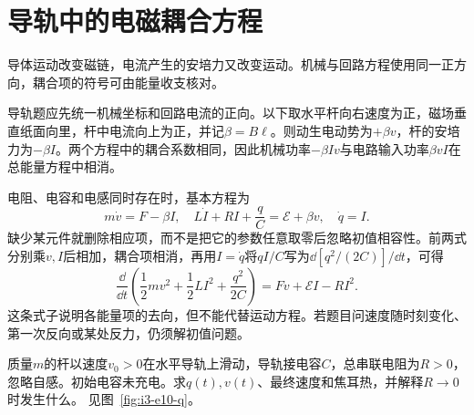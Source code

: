\section{导轨中的电磁耦合方程}\label{sec:i3-coupling}
导体运动改变磁链，电流产生的安培力又改变运动。机械与回路方程使用同一正方向，耦合项的符号可由能量收支核对。

导轨题应先统一机械坐标和回路电流的正向。以下取水平杆向右速度为正，磁场垂直纸面向里，杆中电流向上为正，并记$\beta=B\ell$。则动生电动势为$+\beta v$，杆的安培力为$-\beta I$。两个方程中的耦合系数相同，因此机械功率$-\beta Iv$与电路输入功率$\beta vI$在总能量方程中相消。

电阻、电容和电感同时存在时，基本方程为
\[
m\dot v=F-\beta I,\quad
L\dot I+RI+\frac qC=\mathcal E+\beta v,\quad \dot q=I.
\]
缺少某元件就删除相应项，而不是把它的参数任意取零后忽略初值相容性。前两式分别乘$v,I$后相加，耦合项相消，再用$I=\dot q$将$qI/C$写为$\dd[q^2/(2C)]/\dd t$，可得
\[
\frac{\dd}{\dd t}\left(\frac12mv^2+\frac12LI^2+\frac{q^2}{2C}\right)
=Fv+\mathcal EI-RI^2.
\]
这条式子说明各能量项的去向，但不能代替运动方程。若题目问速度随时刻变化、第一次反向或某处反力，仍须解初值问题。


\begin{example}[水平电容导轨与不可忽略的初始过程]\label{ex:i3-e10}

质量$m$的杆以速度$v_0>0$在水平导轨上滑动，导轨接电容$C$，总串联电阻为$R>0$，忽略自感。初始电容未充电。求$q(t),v(t)$、最终速度和焦耳热，并解释$R\to0$时发生什么。
 见图~\ref{fig:i3-e10-q}。
\end{example}

